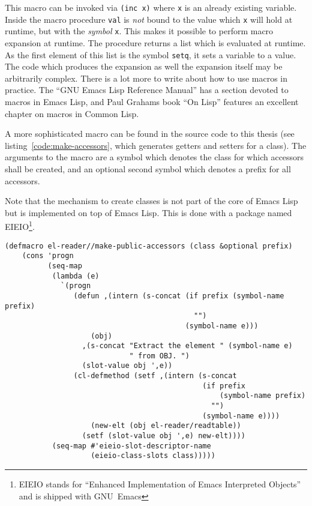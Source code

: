\documentclass[a4paper,10pt,twoside]{report}
\newcommand{\el}{Emacs Lisp}
\newcommand{\cl}{Common Lisp}
\newcommand{\sym}[1]{\texttt{#1}}
\newcommand{\emacs}{GNU~Emacs}
\begin{document}
This macro can be invoked via \texttt{(inc x)} where \sym{x} is an already
existing variable.  Inside the macro procedure \sym{val} is \emph{not} bound to
the value which \sym{x} will hold at runtime, but with the \emph{symbol}
\sym{x}.  This makes it possible to perform macro expansion at runtime.  The
procedure returns a list which is evaluated at runtime.  As the first element of
this list is the symbol \sym{setq}, it sets a variable to a value.  The code
which produces the expansion as well the expansion itself may be arbitrarily
complex.  There is a lot more to write about how to use macros in practice.  The
``GNU Emacs Lisp Reference Manual'' has a section devoted to macros in \el, and
Paul Grahams book ``On Lisp'' \cite{on-lisp} features an excellent chapter on
macros in \cl{}.

A more sophisticated macro can be found in the source code to this thesis (see
listing~\ref{code:make-accessors}, which generates getters and setters for a
class).  The arguments to the macro are a symbol which denotes the class for
which accessors shall be created, and an optional second symbol which denotes a
prefix for all accessors.

Note that the mechanism to create classes is not part of the core of \el{} but
is implemented on top of \el{}.  This is done with a package named
EIEIO\footnote{EIEIO stands for “Enhanced Implementation of Emacs Interpreted
  Objects” and is shipped with \emacs{}}.\cite{eieio}

\begin{lstlisting}[style=lispcode,caption={Create accessors for all data members
  of a given class.},label={code:make-accessors}]
(defmacro el-reader//make-public-accessors (class &optional prefix)
    (cons 'progn
          (seq-map
           (lambda (e)
             `(progn
                (defun ,(intern (s-concat (if prefix (symbol-name prefix)
                                            "")
                                          (symbol-name e)))
                    (obj)
                  ,(s-concat "Extract the element " (symbol-name e)
                             " from OBJ. ")
                  (slot-value obj ',e))
                (cl-defmethod (setf ,(intern (s-concat
                                              (if prefix
                                                  (symbol-name prefix)
                                                "")
                                              (symbol-name e))))
                    (new-elt (obj el-reader/readtable))
                  (setf (slot-value obj ',e) new-elt))))
           (seq-map #'eieio-slot-descriptor-name
                    (eieio-class-slots class)))))
\end{lstlisting}
\end{document}
